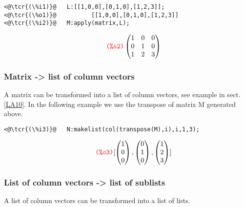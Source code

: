 \documentclass[../Maxima_Workbook.tex]{subfiles}
\begin{document}
\lz \begin{small}
\color{blue}
\begin{lstlisting}
<@\tcr{(\%i1)}@   L:[[1,0,0],[0,1,0],[1,2,3]];
<@\tcr{(\%o1)}@		     [[1,0,0],[0,1,0],[1,2,3]]
<@\tcr{(\%i2)}@   M:apply(matrix,L);
\end{lstlisting}
\vspace{-4mm} \[\tag*{\tcr{\ttfamily (\%o2)}} \begin{pmatrix}1 & 0 & 0 \\ 0 & 1 & 0 \\ 1 & 2 & 3 \end{pmatrix} \]
\color{black}
\end{small} \vspace{-4mm}

\subsubsection{Matrix -> list of column vectors}

A matrix can be transformed into a list of column vectors, see example in sect. \ref{LA10}. In the following example we use the transpose of matrix M generated above.

\lz \begin{small}
\color{blue}
\begin{lstlisting}
<@\tcr{(\%i3)}@   N:makelist(col(transpose(M),i),i,1,3);
\end{lstlisting}
\vspace{-3.5mm} \[\tag*{\tcr{\ttfamily (\%o3)}} [\begin{pmatrix} 1 \\ 0 \\ 0 \end{pmatrix}, \begin{pmatrix} 0 \\ 1 \\ 0 \end{pmatrix}, \begin{pmatrix} 1 \\ 2 \\ 3 \end{pmatrix}] \]
\color{black}
\end{small}

\subsubsection{List of column vectors -> list of sublists}

A list of column vectors can be transformed into a list of lists.
\end{document}
